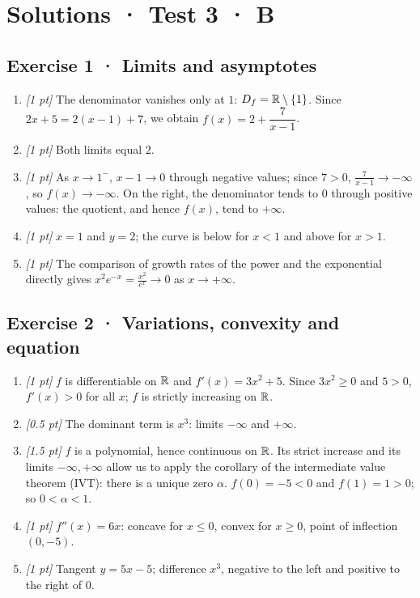 \ifprof\clearpage

\section*{Solutions · Test 3 · B}\label{cor:4-4}

\subsection*{Exercise 1 · Limits and asymptotes}\begin{enumerate}

\item \textit{[1 pt]} The denominator vanishes only at $1$: $D_f=\mathbb R\setminus\{1\}$. Since $2x+5=2(x-1)+7$, we obtain $f(x)=2+\dfrac{7}{x-1}$.

\item \textit{[1 pt]} Both limits equal $2$.

\item \textit{[1 pt]} As $x\to 1^-$, $x-1\to0$ through negative values; since $7>0$, $\frac{7}{x-1}\to-\infty$, so $f(x)\to-\infty$. On the right, the denominator tends to $0$ through positive values: the quotient, and hence $f(x)$, tend to $+\infty$.

\item \textit{[1 pt]} $x=1$ and $y=2$; the curve is below for $x<1$ and above for $x>1$.

\item \textit{[1 pt]} The comparison of growth rates of the power and the exponential directly gives $x^2e^{-x}=\frac{x^2}{e^x}\to0$ as $x\to+\infty$.

\end{enumerate}

\subsection*{Exercise 2 · Variations, convexity and equation}\begin{enumerate}

\item \textit{[1 pt]} $f$ is differentiable on $\mathbb R$ and $f'(x)=3x^2+5$. Since $3x^2\ge0$ and $5>0$, $f'(x)>0$ for all $x$; $f$ is strictly increasing on $\mathbb R$.

\item \textit{[0.5 pt]} The dominant term is $x^3$: limits $-\infty$ and $+\infty$.

\item \textit{[1.5 pt]} $f$ is a polynomial, hence continuous on $\mathbb R$. Its strict increase and its limits $-\infty,+\infty$ allow us to apply the corollary of the intermediate value theorem (IVT): there is a unique zero $\alpha$. $f(0)=-5<0$ and $f(1)=1>0$; so $0<\alpha<1$.

\item \textit{[1 pt]} $f''(x)=6x$: concave for $x\le0$, convex for $x\ge0$, point of inflection $(0,-5)$.

\item \textit{[1 pt]} Tangent $y=5x-5$; difference $x^3$, negative to the left and positive to the right of $0$.

\end{enumerate}

